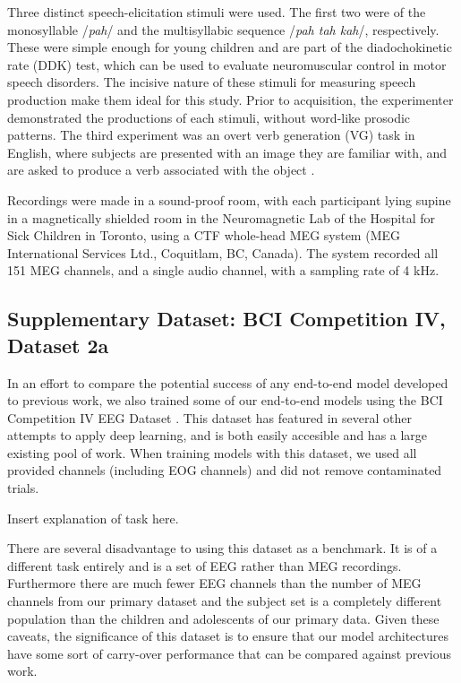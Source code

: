 \documentclass[utf8]{frontiersSCNS} %
\begin{document}

Three distinct speech-elicitation stimuli were used. The first two were of the monosyllable /{\em pah}/ and the multisyllabic sequence /{\em pah tah kah}/, respectively. These were simple enough for young children and are part of the diadochokinetic rate (DDK) test, which can be used to evaluate neuromuscular control in motor speech disorders. The incisive nature of these stimuli for measuring speech production make them ideal for this study. Prior to acquisition, the experimenter demonstrated the productions of each stimuli, without word-like prosodic patterns. The third experiment was an overt verb generation (VG) task in English, where subjects are presented with an image they are familiar with, and are asked to produce a verb associated with the object \cite{Doesburg2016}.

Recordings were made in a sound-proof room, with each participant lying supine in a magnetically shielded room in the Neuromagnetic Lab of the Hospital for Sick Children in Toronto, using a CTF whole-head MEG system (MEG International Services Ltd., Coquitlam, BC, Canada). The system recorded all 151 MEG channels, and a single audio channel, with a sampling rate of 4 kHz.

\subsection{Supplementary Dataset: BCI Competition IV, Dataset 2a}

In an effort to compare the potential success of any end-to-end model developed to previous work, we also trained some of our end-to-end models using the BCI Competition IV EEG Dataset \cite{Tangermann2012}. This dataset has featured in several other attempts to apply deep learning, and is both easily accesible and has a large existing pool of work. When training models with this dataset, we used all provided channels (including EOG channels) and did not remove contaminated trials.

Insert explanation of task here.

There are several disadvantage to using this dataset as a benchmark. It is of a different task entirely and is a set of EEG rather than MEG recordings. Furthermore there are much fewer EEG channels than the number of MEG channels from our primary dataset and the subject set is a completely different population than the children and adolescents of our primary data. Given these caveats, the significance of this dataset is to ensure that our model architectures have some sort of carry-over performance that can be compared against previous work. 
\end{document}
